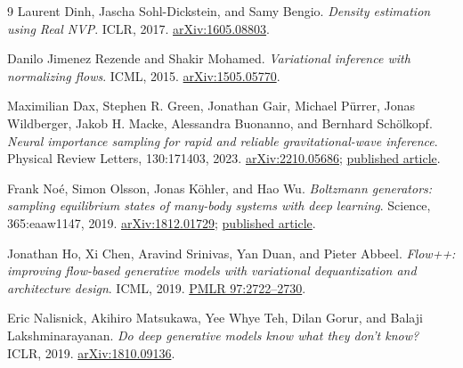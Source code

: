 \documentclass[11pt,a4paper]{article}
\begin{document}
\begin{thebibliography}{9}
Laurent Dinh, Jascha Sohl-Dickstein, and Samy Bengio.
\emph{Density estimation using Real NVP}. ICLR, 2017.
\href{https://arxiv.org/abs/1605.08803}{arXiv:1605.08803}.

Danilo Jimenez Rezende and Shakir Mohamed.
\emph{Variational inference with normalizing flows}. ICML, 2015.
\href{https://arxiv.org/abs/1505.05770}{arXiv:1505.05770}.

Maximilian Dax, Stephen R. Green, Jonathan Gair, Michael P\"urrer,
Jonas Wildberger, Jakob H. Macke, Alessandra Buonanno, and Bernhard Sch\"olkopf.
\emph{Neural importance sampling for rapid and reliable gravitational-wave inference}.
Physical Review Letters, 130:171403, 2023.
\href{https://arxiv.org/abs/2210.05686}{arXiv:2210.05686};
\href{https://doi.org/10.1103/PhysRevLett.130.171403}{published article}.

Frank No\'e, Simon Olsson, Jonas K\"ohler, and Hao Wu.
\emph{Boltzmann generators: sampling equilibrium states of many-body systems
with deep learning}. Science, 365:eaaw1147, 2019.
\href{https://arxiv.org/abs/1812.01729}{arXiv:1812.01729};
\href{https://doi.org/10.1126/science.aaw1147}{published article}.

Jonathan Ho, Xi Chen, Aravind Srinivas, Yan Duan, and Pieter Abbeel.
\emph{Flow++: improving flow-based generative models with variational
dequantization and architecture design}. ICML, 2019.
\href{https://proceedings.mlr.press/v97/ho19a.html}{PMLR 97:2722--2730}.

Eric Nalisnick, Akihiro Matsukawa, Yee Whye Teh, Dilan Gorur, and
Balaji Lakshminarayanan.
\emph{Do deep generative models know what they don't know?} ICLR, 2019.
\href{https://arxiv.org/abs/1810.09136}{arXiv:1810.09136}.
\end{thebibliography}
\end{document}
